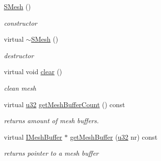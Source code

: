 \begin{DoxyCompactItemize}
\mbox{\label{structirr_1_1scene_1_1SMesh_aab06c74fc6a28e791e09b9f91f9ded89}} 
\hyperlink{structirr_1_1scene_1_1SMesh_aab06c74fc6a28e791e09b9f91f9ded89}{S\+Mesh} ()
\begin{DoxyCompactList}\small\item\em constructor \end{DoxyCompactList}\item 
\mbox{\label{structirr_1_1scene_1_1SMesh_aafb289351ba15b01c139159f028928e6}} 
virtual \hyperlink{structirr_1_1scene_1_1SMesh_aafb289351ba15b01c139159f028928e6}{$\sim$\+S\+Mesh} ()
\begin{DoxyCompactList}\small\item\em destructor \end{DoxyCompactList}\item 
\mbox{\label{structirr_1_1scene_1_1SMesh_a9a59598f69840164cc06a2059ff4de68}} 
virtual void \hyperlink{structirr_1_1scene_1_1SMesh_a9a59598f69840164cc06a2059ff4de68}{clear} ()
\begin{DoxyCompactList}\small\item\em clean mesh \end{DoxyCompactList}\item 
\mbox{\label{structirr_1_1scene_1_1SMesh_a08f677a62f8e3770af70293c8043fff4}} 
virtual \hyperlink{namespaceirr_a0416a53257075833e7002efd0a18e804}{u32} \hyperlink{structirr_1_1scene_1_1SMesh_a08f677a62f8e3770af70293c8043fff4}{get\+Mesh\+Buffer\+Count} () const
\begin{DoxyCompactList}\small\item\em returns amount of mesh buffers. \end{DoxyCompactList}\item 
\mbox{\label{structirr_1_1scene_1_1SMesh_ad88b3ecd7e6f00e0ea5defb76ed205fc}} 
virtual \hyperlink{classirr_1_1scene_1_1IMeshBuffer}{I\+Mesh\+Buffer} $\ast$ \hyperlink{structirr_1_1scene_1_1SMesh_ad88b3ecd7e6f00e0ea5defb76ed205fc}{get\+Mesh\+Buffer} (\hyperlink{namespaceirr_a0416a53257075833e7002efd0a18e804}{u32} nr) const
\begin{DoxyCompactList}\small\item\em returns pointer to a mesh buffer \end{DoxyCompactList}\item 

\end{DoxyCompactItemize}

